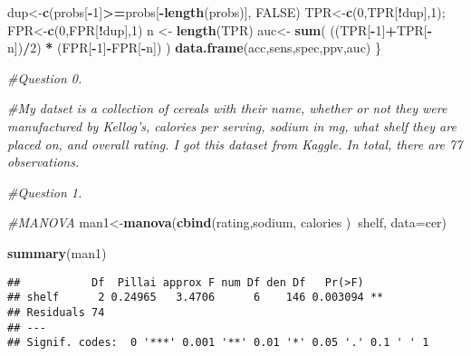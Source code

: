 \documentclass[]{article}
\newenvironment{Shaded}{\begin{snugshade}}{\end{snugshade}}
\newcommand{\CommentTok}[1]{\textcolor[rgb]{0.56,0.35,0.01}{\textit{#1}}}
\newcommand{\DataTypeTok}[1]{\textcolor[rgb]{0.13,0.29,0.53}{#1}}
\newcommand{\DecValTok}[1]{\textcolor[rgb]{0.00,0.00,0.81}{#1}}
\newcommand{\KeywordTok}[1]{\textcolor[rgb]{0.13,0.29,0.53}{\textbf{#1}}}
\newcommand{\NormalTok}[1]{#1}
\newcommand{\OperatorTok}[1]{\textcolor[rgb]{0.81,0.36,0.00}{\textbf{#1}}}
\newcommand{\OtherTok}[1]{\textcolor[rgb]{0.56,0.35,0.01}{#1}}
\newcommand{\StringTok}[1]{\textcolor[rgb]{0.31,0.60,0.02}{#1}}
\begin{document}
\begin{Shaded}
\begin{Highlighting}[]
\NormalTok{dup<-}\KeywordTok{c}\NormalTok{(probs[}\OperatorTok{-}\DecValTok{1}\NormalTok{]}\OperatorTok{>=}\NormalTok{probs[}\OperatorTok{-}\KeywordTok{length}\NormalTok{(probs)], }\OtherTok{FALSE}\NormalTok{)}
\NormalTok{TPR<-}\KeywordTok{c}\NormalTok{(}\DecValTok{0}\NormalTok{,TPR[}\OperatorTok{!}\NormalTok{dup],}\DecValTok{1}\NormalTok{); FPR<-}\KeywordTok{c}\NormalTok{(}\DecValTok{0}\NormalTok{,FPR[}\OperatorTok{!}\NormalTok{dup],}\DecValTok{1}\NormalTok{)}
\NormalTok{n <-}\StringTok{ }\KeywordTok{length}\NormalTok{(TPR)}
\NormalTok{auc<-}\StringTok{ }\KeywordTok{sum}\NormalTok{( ((TPR[}\OperatorTok{-}\DecValTok{1}\NormalTok{]}\OperatorTok{+}\NormalTok{TPR[}\OperatorTok{-}\NormalTok{n])}\OperatorTok{/}\DecValTok{2}\NormalTok{) }\OperatorTok{*}\StringTok{ }\NormalTok{(FPR[}\OperatorTok{-}\DecValTok{1}\NormalTok{]}\OperatorTok{-}\NormalTok{FPR[}\OperatorTok{-}\NormalTok{n]) )}
\KeywordTok{data.frame}\NormalTok{(acc,sens,spec,ppv,auc)}
\NormalTok{\}}
\end{Highlighting}
\end{Shaded}

\begin{Shaded}
\begin{Highlighting}[]
\CommentTok{#Question 0.}

\CommentTok{#My datset is a collection of cereals with their name, whether or not they were manufactured by Kellog's, calories per serving, sodium in mg, what shelf they are placed on, and overall rating. I got this dataset from Kaggle. In total, there are 77 observations. }
\end{Highlighting}
\end{Shaded}

\begin{Shaded}
\begin{Highlighting}[]
\CommentTok{#Question 1.}

\CommentTok{#MANOVA}
\NormalTok{man1<-}\KeywordTok{manova}\NormalTok{(}\KeywordTok{cbind}\NormalTok{(rating,sodium, calories )}\OperatorTok{~}\NormalTok{shelf, }\DataTypeTok{data=}\NormalTok{cer)}

\KeywordTok{summary}\NormalTok{(man1)}
\end{Highlighting}
\end{Shaded}

\begin{verbatim}
##           Df  Pillai approx F num Df den Df   Pr(>F)   
## shelf      2 0.24965   3.4706      6    146 0.003094 **
## Residuals 74                                           
## ---
## Signif. codes:  0 '***' 0.001 '**' 0.01 '*' 0.05 '.' 0.1 ' ' 1
\end{verbatim}
\end{document}
